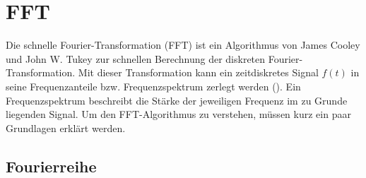 





\section{FFT}

Die schnelle Fourier-Transformation (FFT) ist ein Algorithmus von  James Cooley und John W. Tukey zur schnellen Berechnung der diskreten Fourier-Transformation. Mit dieser Transformation kann ein zeitdiskretes Signal $f(t)$ in seine Frequenzanteile bzw. Frequenzspektrum zerlegt werden (\cite[S.14]{hejobu 84}). Ein Frequenzspektrum beschreibt die Stärke der jeweiligen Frequenz im zu Grunde liegenden Signal. Um den FFT-Algorithmus zu verstehen, müssen kurz ein paar Grundlagen erklärt werden.


\subsection{Fourierreihe}

